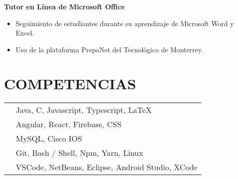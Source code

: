 \documentclass{res}
\begin{document}
\begin{resume}
    \textbf{Tutor en Línea de Microsoft Office} 
    \begin{itemize}
        \item Seguimiento de estudiantes durante su aprendizaje de Microsoft Word y Excel.
        \item Uso de la plataforma PrepaNet del Tecnológico de Monterrey.
    \end{itemize}

    \longjump

    \section{\large{COMPETENCIAS}} 
    \begin{tabularx}{15cm}{SB}
         &
        Java, C, Javascript, Typescript, LaTeX
        \\
         &
        Angular, React, Firebase, CSS
        \\
         &
        MySQL, Cisco IOS
        \\
         &
        Git, Bash / Shell, Npm, Yarn, Linux
        \\
         &
        VSCode, NetBeans, Eclipse, Android Studio, XCode
    \end{tabularx}
\end{resume}
\end{document}
